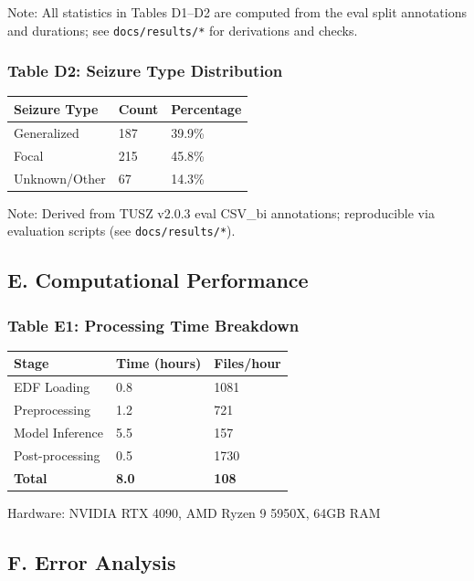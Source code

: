 \documentclass[
  10pt,
]{article}
\begin{document}
Note: All statistics in Tables D1--D2 are computed from the eval split
annotations and durations; see \texttt{docs/results/*} for derivations
and checks.

\hypertarget{table-d2-seizure-type-distribution}{%
\subsubsection{Table D2: Seizure Type
Distribution}\label{table-d2-seizure-type-distribution}}

\begin{longtable}[]{@{}lll@{}}
\toprule
Seizure Type & Count & Percentage\tabularnewline
\midrule
\endhead
Generalized & 187 & 39.9\%\tabularnewline
Focal & 215 & 45.8\%\tabularnewline
Unknown/Other & 67 & 14.3\%\tabularnewline
\bottomrule
\end{longtable}

Note: Derived from TUSZ v2.0.3 eval CSV\_bi annotations; reproducible
via evaluation scripts (see \texttt{docs/results/*}).

\hypertarget{e.-computational-performance}{%
\subsection{E. Computational
Performance}\label{e.-computational-performance}}

\hypertarget{table-e1-processing-time-breakdown}{%
\subsubsection{Table E1: Processing Time
Breakdown}\label{table-e1-processing-time-breakdown}}

\begin{longtable}[]{@{}lll@{}}
\toprule
Stage & Time (hours) & Files/hour\tabularnewline
\midrule
\endhead
EDF Loading & 0.8 & 1081\tabularnewline
Preprocessing & 1.2 & 721\tabularnewline
Model Inference & 5.5 & 157\tabularnewline
Post-processing & 0.5 & 1730\tabularnewline
\textbf{Total} & \textbf{8.0} & \textbf{108}\tabularnewline
\bottomrule
\end{longtable}

Hardware: NVIDIA RTX 4090, AMD Ryzen 9 5950X, 64GB RAM

\hypertarget{f.-error-analysis}{%
\subsection{F. Error Analysis}\label{f.-error-analysis}}
\end{document}
